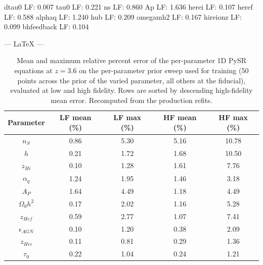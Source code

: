 dtau0         LF:   0.007%
tau0          LF:   0.221%
ns            LF:   0.860%
Ap            LF:   1.636%
herei         LF:   0.107%
heref         LF:   0.588%
alphaq        LF:   1.240%
hub           LF:   0.209%
omegamh2      LF:   0.167%
hireionz      LF:   0.099%
bhfeedback    LF:   0.104%

--- LaTeX ---
\begin{table}[!h]
\caption{\label{tab:stats_table} Mean and maximum relative percent error of the per-parameter 1D PySR equations at $z=3.6$ on the per-parameter prior sweep used for training (50 points across the prior of the varied parameter, all others at the fiducial), evaluated at low and high fidelity. Rows are sorted by descending high-fidelity mean error. Recomputed from the production refits.}
\begin{ruledtabular}
\centering
\begin{tabular}{c|cccc}
Parameter & LF mean (\%) & LF max (\%) & HF mean (\%) & HF max (\%) \\
\hline
$n_S$ & 0.86 & 5.30 & 5.16 & 10.78 \\
$h$ & 0.21 & 1.72 & 1.68 & 10.50 \\
$z_{Hi}$ & 0.10 & 1.28 & 1.61 & 7.76 \\
$\alpha_q$ & 1.24 & 1.95 & 1.46 & 3.18 \\
$A_P$ & 1.64 & 4.49 & 1.18 & 4.49 \\
$\Omega_0 h^2$ & 0.17 & 2.02 & 1.16 & 5.28 \\
$z_{Hef}$ & 0.59 & 2.77 & 1.07 & 7.41 \\
$\epsilon_{AGN}$ & 0.10 & 1.20 & 0.38 & 2.09 \\
$z_{Hei}$ & 0.11 & 0.81 & 0.29 & 1.36 \\
$\tau_0$ & 0.22 & 1.04 & 0.24 & 1.21 \\
\end{tabular}
\end{ruledtabular}
\end{table}
